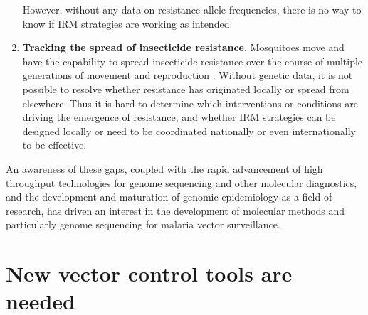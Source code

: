 \documentclass[a4paper,11pt,abstracton,hidelinks]{scrartcl}
\begin{document}
\begin{enumerate}
%
However, without any data on resistance allele frequencies, there is no way to know if IRM strategies are working as intended.
%
\item \textbf{Tracking the spread of insecticide resistance}. 
%
Mosquitoes move and have the capability to spread insecticide resistance over the course of multiple generations of movement and reproduction \citep{Service1997,Huestis2019}.
%
Without genetic data, it is not possible to resolve whether resistance has originated locally or spread from elsewhere.
%
Thus it is hard to determine which interventions or conditions are driving the emergence of resistance, and whether IRM strategies can be designed locally or need to be coordinated nationally or even internationally to be effective.
%
\end{enumerate}
%
An awareness of these gaps, coupled with the rapid advancement of high throughput technologies for genome sequencing and other molecular diagnostics, and the development and maturation of genomic epidemiology as a field of research, has driven an interest in the development of molecular methods and particularly genome sequencing for malaria vector surveillance.


\section{New vector control tools are needed}
\end{document}
